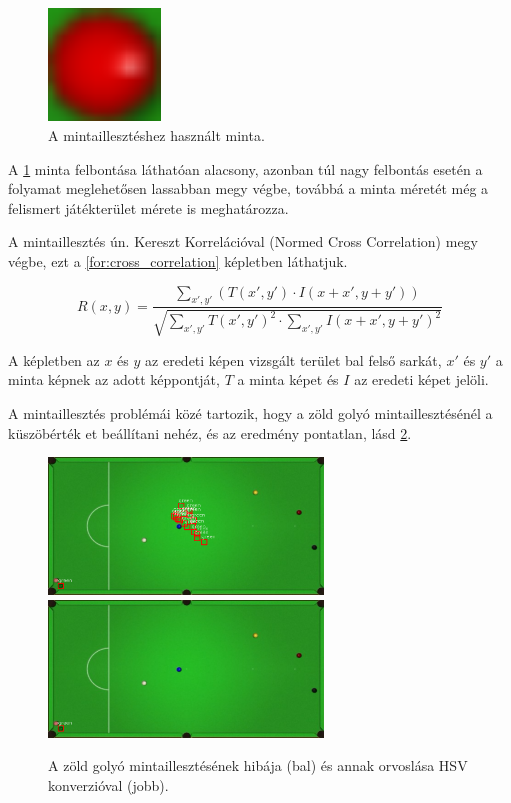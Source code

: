 \begin{figure}[!ht]
    \centering
    \includegraphics[width=30mm, keepaspectratio]{figures/template_red.png}
    \caption{A mintaillesztéshez használt minta.}
    \label{fig:minta_kep}
\end{figure}

\par A \ref{fig:minta_kep} minta felbontása láthatóan alacsony, azonban túl nagy felbontás esetén a folyamat meglehetősen lassabban megy végbe, továbbá a minta méretét még a felismert játékterület mérete is meghatározza.
\par A mintaillesztés ún. Kereszt Korrelációval (Normed Cross Correlation) megy végbe, ezt a \ref{for:cross_correlation} képletben láthatjuk\cite{template_match}.

\begin{equation}
    R(x, y) = \frac{\sum_{x',y'}(T(x',y') \cdot I(x + x', y + y'))}{\sqrt{\sum_{x',y'}T(x',y')^2 \cdot \sum_{x',y'}I(x + x',y + y')^2}}
    \label{for:cross_correlation}
\end{equation}

\par A képletben az $x$ és $y$ az eredeti képen vizsgált terület bal felső sarkát, $x'$ és $y'$ a minta képnek az adott képpontját, $T$ a minta képet és $I$ az eredeti képet jelöli.
\par A mintaillesztés problémái közé tartozik, hogy a zöld golyó mintaillesztésénél a küszöbérték et beállítani nehéz, és az eredmény pontatlan, lásd \ref{fig:rossz_zold}.

\begin{figure}[!ht]
    \centering
    \includegraphics[width=73mm, keepaspectratio]{figures/wrong_green.png}\hspace{2mm}
	\includegraphics[width=73mm, keepaspectratio]{figures/green_ok.png}\\\vspace{5mm}
    \caption{A zöld golyó mintaillesztésének hibája (bal) és annak orvoslása HSV konverzióval (jobb).}
    \label{fig:rossz_zold}
\end{figure}

